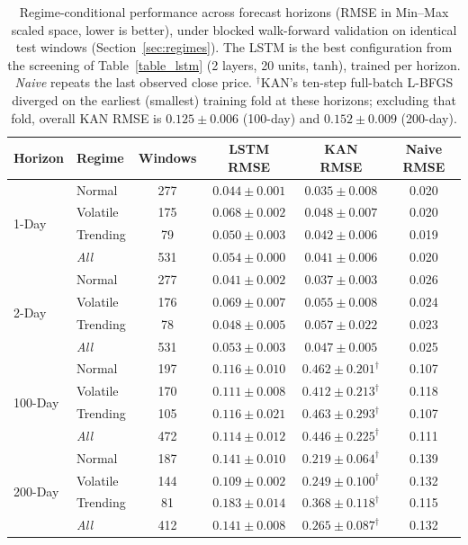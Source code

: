 \begin{table}[!ht]
\centering
\scriptsize
\renewcommand{\arraystretch}{1.15}
\setlength{\tabcolsep}{4pt}
\begin{tabular}{|l|l|c|c|c|c|}
\hline
\textbf{Horizon} & \textbf{Regime} & \textbf{Windows} & \textbf{LSTM RMSE} & \textbf{KAN RMSE} & \textbf{Naive RMSE} \\
\hline
  \multirow{4}{*}{1-Day} & Normal & 277 & $0.044 \pm 0.001$ & $0.035 \pm 0.008$ & 0.020 \\
   & Volatile & 175 & $0.068 \pm 0.002$ & $0.048 \pm 0.007$ & 0.020 \\
   & Trending & 79 & $0.050 \pm 0.003$ & $0.042 \pm 0.006$ & 0.019 \\
  & \textit{All} & 531 & $0.054 \pm 0.000$ & $0.041 \pm 0.006$ & 0.020 \\
\hline
  \multirow{4}{*}{2-Day} & Normal & 277 & $0.041 \pm 0.002$ & $0.037 \pm 0.003$ & 0.026 \\
   & Volatile & 176 & $0.069 \pm 0.007$ & $0.055 \pm 0.008$ & 0.024 \\
   & Trending & 78 & $0.048 \pm 0.005$ & $0.057 \pm 0.022$ & 0.023 \\
  & \textit{All} & 531 & $0.053 \pm 0.003$ & $0.047 \pm 0.005$ & 0.025 \\
\hline
  \multirow{4}{*}{100-Day} & Normal & 197 & $0.116 \pm 0.010$ & $0.462 \pm 0.201^{\dagger}$ & 0.107 \\
   & Volatile & 170 & $0.111 \pm 0.008$ & $0.412 \pm 0.213^{\dagger}$ & 0.118 \\
   & Trending & 105 & $0.116 \pm 0.021$ & $0.463 \pm 0.293^{\dagger}$ & 0.107 \\
  & \textit{All} & 472 & $0.114 \pm 0.012$ & $0.446 \pm 0.225^{\dagger}$ & 0.111 \\
\hline
  \multirow{4}{*}{200-Day} & Normal & 187 & $0.141 \pm 0.010$ & $0.219 \pm 0.064^{\dagger}$ & 0.139 \\
   & Volatile & 144 & $0.109 \pm 0.002$ & $0.249 \pm 0.100^{\dagger}$ & 0.132 \\
   & Trending & 81 & $0.183 \pm 0.014$ & $0.368 \pm 0.118^{\dagger}$ & 0.115 \\
  & \textit{All} & 412 & $0.141 \pm 0.008$ & $0.265 \pm 0.087^{\dagger}$ & 0.132 \\
\hline
\end{tabular}
\caption{Regime-conditional performance across forecast horizons (RMSE
in Min--Max scaled space, lower is better), under blocked walk-forward
validation on identical test windows (Section~\ref{sec:regimes}). The
LSTM is the best configuration from the screening of
Table~\ref{table_lstm} (2 layers, 20 units, tanh), trained per horizon.
\emph{Naive} repeats the last observed close price.
$^{\dagger}$KAN's ten-step full-batch L-BFGS diverged on the earliest
(smallest) training fold at these horizons; excluding that fold, overall
KAN RMSE is $0.125 \pm 0.006$ (100-day) and $0.152 \pm 0.009$
(200-day).}
\label{table_comprehensive_comparison}
\end{table}
